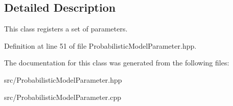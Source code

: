 \subsection{Detailed Description}
This class registers a set of parameters. 

Definition at line 51 of file Probabilistic\+Model\+Parameter.\+hpp.



The documentation for this class was generated from the following files\+:\begin{DoxyCompactItemize}
\item 
src/Probabilistic\+Model\+Parameter.\+hpp\item 
src/Probabilistic\+Model\+Parameter.\+cpp\end{DoxyCompactItemize}
